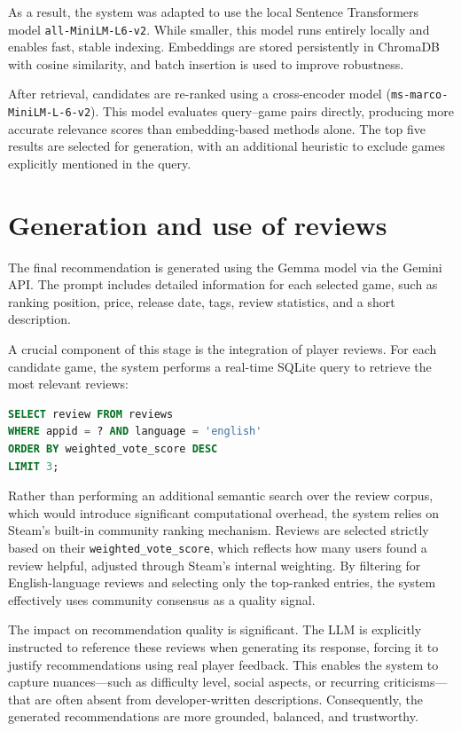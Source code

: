 As a result, the system was adapted to use the local Sentence Transformers model \texttt{all-MiniLM-L6-v2}. While smaller, this model runs entirely locally and enables fast, stable indexing. Embeddings are stored persistently in ChromaDB with cosine similarity, and batch insertion is used to improve robustness.

After retrieval, candidates are re-ranked using a cross-encoder model (\texttt{ms-marco-MiniLM-L-6-v2}). This model evaluates query–game pairs directly, producing more accurate relevance scores than embedding-based methods alone. The top five results are selected for generation, with an additional heuristic to exclude games explicitly mentioned in the query.

\section{Generation and use of reviews}
The final recommendation is generated using the Gemma model via the Gemini API. The prompt includes detailed information for each selected game, such as ranking position, price, release date, tags, review statistics, and a short description.

A crucial component of this stage is the integration of player reviews. For each candidate game, the system performs a real-time SQLite query to retrieve the most relevant reviews:

\begin{lstlisting}[language=SQL, caption=SQL query for fetching top helpful reviews.]
SELECT review FROM reviews 
WHERE appid = ? AND language = 'english' 
ORDER BY weighted_vote_score DESC 
LIMIT 3;
\end{lstlisting}

Rather than performing an additional semantic search over the review corpus, which would introduce significant computational overhead, the system relies on Steam’s built-in community ranking mechanism. Reviews are selected strictly based on their \texttt{weighted\_vote\_score}, which reflects how many users found a review helpful, adjusted through Steam’s internal weighting. By filtering for English-language reviews and selecting only the top-ranked entries, the system effectively uses community consensus as a quality signal.

The impact on recommendation quality is significant. The LLM is explicitly instructed to reference these reviews when generating its response, forcing it to justify recommendations using real player feedback. This enables the system to capture nuances---such as difficulty level, social aspects, or recurring criticisms---that are often absent from developer-written descriptions. Consequently, the generated recommendations are more grounded, balanced, and trustworthy.


